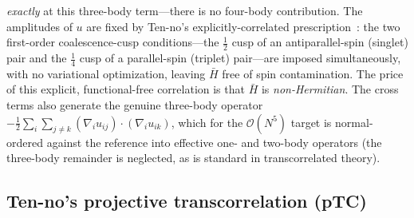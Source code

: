 \documentclass[aps,prb,reprint,superscriptaddress,floatfix]{revtex4-2}
\newcommand{\Hbar}{\bar{H}}
\begin{document}
\emph{exactly} at this three-body term---there is no four-body contribution. The
amplitudes of $u$ are fixed by Ten-no's explicitly-correlated
prescription~\cite{tenno2000,tenno2023}: the two first-order coalescence-cusp
conditions---the $\tfrac12$ cusp of an antiparallel-spin (singlet) pair and the
$\tfrac14$ cusp of a parallel-spin (triplet) pair---are imposed simultaneously,
with no variational optimization, leaving $\Hbar$ free of spin contamination. The
price of this explicit, functional-free correlation is that $\Hbar$ is
\emph{non-Hermitian}. The cross terms also generate the genuine three-body
operator $-\tfrac12\sum_i\sum_{j\neq k}(\nabla_i u_{ij})\!\cdot\!(\nabla_i u_{ik})$,
which for the $\mathcal{O}(N^5)$ target is normal-ordered against the reference
into effective one- and two-body operators (the three-body remainder is neglected,
as is standard in transcorrelated theory).

\subsection{Ten-no's projective transcorrelation (pTC)}
\label{sec:ptc}
\end{document}
